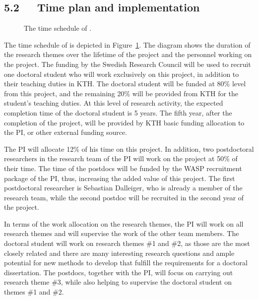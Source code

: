 \documentclass[a4paper,11pt]{article}
\begin{document}
\subsection*{5.2~~~Time plan and implementation}


\begin{figure}[t]
\begin{center}
\vspace{-2mm}
{\small}
\end{center}
\vspace{-6mm}
\caption{\label{figure:gantt}The time schedule of {\acronym}.}
\vspace{-2mm}
\end{figure}

The time schedule of \acronym is depicted in Figure~\ref{figure:gantt}. 
The diagram shows the duration of the research themes over the lifetime of the project
and the personnel working on the project.
%
The funding by the Swedish Research Council will be used to recruit 
one doctoral student who will work exclusively on this project, 
in addition to their teaching duties in KTH.
The doctoral student will be funded at 80\% level from this project, 
and the remaining 20\% will be provided from KTH for the student's teaching duties. 
At this level of research activity, the expected completion time of the doctoral student is 5 years. 
The fifth year, after the completion of the project, 
will be provided by KTH basic funding allocation to the PI, or other external funding source. 

The PI will allocate 12\% of his time on this project.
In addition, two postdoctoral researchers in the research team of the PI
will work on the project at 50\% of their time. 
The time of the postdocs will be funded by the WASP recruitment package of the PI, 
thus, increasing the added value of this project.
The first postdoctoral researcher is Sebastian Dalleiger, 
who is already a member of the research team, 
while the second postdoc will be recruited in the second year of the project.

In terms of the work allocation on the research themes, 
the PI will work on all research themes and will supervise the work of the other team members. 
The doctoral student will work on research themes \#1 and \#2, 
as those are the most closely related and there are many interesting research questions
and ample potential for new methods to develop that fulfill the requirements for a doctoral dissertation. 
The postdocs, together with the PI, will focus on carrying out research theme \#3,
while also helping to supervise the doctoral student on themes \#1 and \#2.
\end{document}
